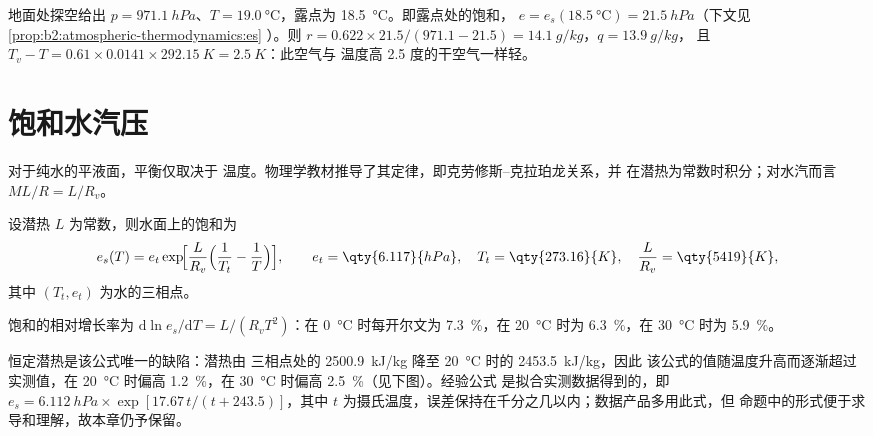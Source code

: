 \begin{example}[诺曼的空气]\label{ex:b2:atmospheric-thermodynamics:norman}
地面处探空给出 $p = \qty{971.1}{hPa}$、$T = \qty{19.0}{\celsius}$，露点为
\qty{18.5}{\celsius}。即露点处的饱和，
$e = e_s(\qty{18.5}{\celsius}) = \qty{21.5}{hPa}$（下文见\cref{prop:b2:atmospheric-thermodynamics:es}
）。则 $r = 0.622 \times 21.5/(971.1 - 21.5) = \qty{14.1}{g/kg}$，$q = \qty{13.9}{g/kg}$，
且 $T_v - T = 0.61 \times 0.0141 \times \qty{292.15}{K} = \qty{2.5}{K}$：此空气与
温度高 2.5 度的干空气一样轻。
\end{example}

\section{饱和水汽压}\label{sec:b2:atmospheric-thermodynamics:saturation}

对于纯水的平液面，平衡仅取决于
温度。物理学教材推导了其定律，即克劳修斯–克拉珀龙关系，并
在潜热为常数时积分；对水汽而言 $M L/R = L/R_v$。

\begin{proposition}[饱和水汽压]\label{prop:b2:atmospheric-thermodynamics:es}
设潜热 $L$ 为常数，则水面上的饱和为
\[
  e_s(T) = e_t \exp\!\Bigl[\frac{L}{R_v}\Bigl(\frac{1}{T_t} - \frac{1}{T}\Bigr)\Bigr],
  \qquad e_t = \qty{6.117}{hPa}, \quad T_t = \qty{273.16}{K}, \quad \frac{L}{R_v} =
  \qty{5419}{K},
\]
其中 $(T_t, e_t)$ 为水的三相点。
\end{proposition}

\begin{corollary}[每开尔文百分之七]\label{cor:b2:atmospheric-thermodynamics:seven}
饱和的相对增长率为
$\mathrm{d}\ln e_s/\mathrm{d}T = L/(R_v T^2)$：在
\qty{0}{\celsius} 时每开尔文为 \qty{7.3}{\percent}，在 \qty{20}{\celsius} 时为 \qty{6.3}{\percent}，在
\qty{30}{\celsius} 时为 \qty{5.9}{\percent}。
\end{corollary}

恒定潜热是该公式唯一的缺陷：潜热由
三相点处的 \qty{2500.9}{kJ/kg} 降至 \qty{20}{\celsius} 时的 \qty{2453.5}{kJ/kg}，因此
该公式的值随温度升高而逐渐超过实测值，在 \qty{20}{\celsius} 时偏高
\qty{1.2}{\percent}，在 \qty{30}{\celsius} 时偏高 \qty{2.5}{\percent}（见下图）。经验公式
是拟合实测数据得到的，即 $e_s = \qty{6.112}{hPa} \times \exp[17.67\,t/(t + 243.5)]$，其中
$t$ 为摄氏温度，误差保持在千分之几以内；数据产品多用此式，但
命题中的形式便于求导和理解，故本章仍予保留。

